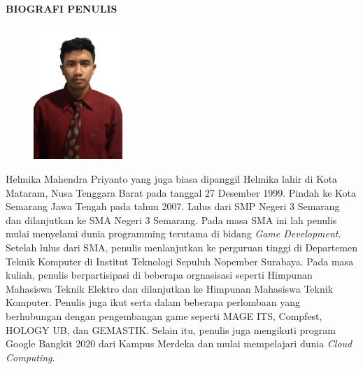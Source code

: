 \begin{center}
  \Large
  \textbf{BIOGRAFI PENULIS}
\end{center}


\vspace{2ex}

\begin{figure}
  \centering
  \vspace{-3ex}
  \includegraphics[width=0.3\textwidth]{gambar/helmika_2020pas.jpg}
  \vspace{-4ex}
\end{figure}

\par Helmika Mahendra Priyanto yang juga biasa dipanggil Helmika lahir di Kota Mataram,
Nusa Tenggara Barat pada tanggal 27 Desember 1999. Pindah ke Kota Semarang Jawa Tengah
pada tahun 2007. Lulus dari SMP Negeri 3 Semarang dan dilanjutkan ke SMA Negeri 3 Semarang.
Pada masa SMA ini lah penulis mulai menyelami dunia programming terutama di bidang \emph{Game Development}.
Setelah lulus dari SMA, penulis menlanjutkan ke perguruan tinggi di Departemen Teknik Komputer di
Institut Teknologi Sepuluh Nopember Surabaya.  Pada masa kuliah, penulis berpartisipasi di beberapa
orgnasisasi seperti Himpunan Mahasiswa Teknik Elektro dan dilanjutkan ke Himpunan Mahasiswa Teknik Komputer.
Penulis juga ikut serta dalam beberapa perlombaan yang berhubungan dengan pengembangan game seperti MAGE ITS, Compfest,
HOLOGY UB, dan GEMASTIK. Selain itu, penulis juga mengikuti program Google Bangkit 2020 dari Kampus Merdeka
dan mulai mempelajari dunia \emph{Cloud Computing}.
